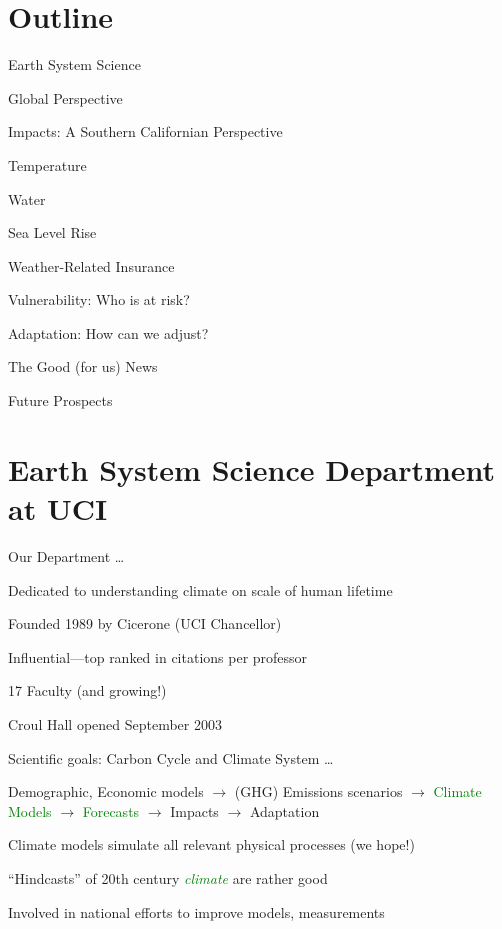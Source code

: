 \documentclass[12pt]{article}
\begin{document}
\begin{print}
\tableofcontents
\end{print}
\begin{screen}
\vfill
\end{screen}

\Large
\section[Outline]{Outline}
\begin{itemize*}
\item Earth System Science 
\item Global Perspective 
\item Impacts: A Southern Californian Perspective
\begin{itemize*}
\item Temperature
\item Water
\item Sea Level Rise
\item Weather-Related Insurance
\end{itemize*}
\item Vulnerability: Who is at risk?
\item Adaptation: How can we adjust?
\begin{itemize*}
\item The Good (for us) News 
\end{itemize*}
\item Future Prospects
\end{itemize*}
\vfill

\section[Earth System Science]{Earth System Science Department at UCI}
Our Department \ldots
\begin{itemize*}
\item Dedicated to understanding climate on scale of human lifetime
\item Founded 1989 by Cicerone (UCI Chancellor)
\item Influential---top ranked in citations per professor
\item 17 Faculty (and growing!)
\item Croul Hall opened September 2003
\end{itemize*}
Scientific goals: Carbon Cycle and Climate System \ldots
\begin{itemize*}
\item Demographic, Economic models $\rightarrow$ (GHG)
Emissions scenarios $\rightarrow$ \textcolor{green}{Climate Models} $\rightarrow$
\textcolor{green}{Forecasts} $\rightarrow$ Impacts $\rightarrow$ Adaptation
\item Climate models simulate all relevant physical processes (we hope!)
\item ``Hindcasts'' of 20th century \textcolor{green}{\textit{climate}} are rather good
\item Involved in national efforts to improve models, measurements
\end{itemize*}
\vfill
\end{document}
